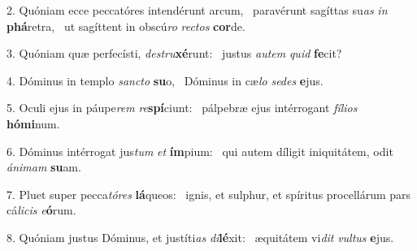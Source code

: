 2. Quóniam ecce peccatóres intendérunt arcum, \dag\  paravérunt sagíttas su\textit{as} \textit{in} \textbf{phá}retra, \ast\  ut sagíttent in obscú\textit{ro} \textit{rec}\textit{tos} \textbf{cor}de.\

3. Quóniam quæ perfecísti, \textit{de}\textit{stru}\textbf{xé}runt: \ast\  justus \textit{au}\textit{tem} \textit{quid} \textbf{fe}cit?\

4. Dóminus in templo \textit{sanc}\textit{to} \textbf{su}o, \ast\  Dóminus in cæ\textit{lo} \textit{se}\textit{des} \textbf{e}jus.\

5. Oculi ejus in páupe\textit{rem} \textit{re}\textbf{spí}ciunt: \ast\  pálpebræ ejus intérrogant \textit{fí}\textit{li}\textit{os} \textbf{hó}\textbf{mi}num.\

6. Dóminus intérrogat jus\textit{tum} \textit{et} \textbf{ím}pium: \ast\  qui autem díligit iniquitátem, odit \textit{á}\textit{ni}\textit{mam} \textbf{su}am.\

7. Pluet super pecca\textit{tó}\textit{res} \textbf{lá}queos: \ast\  ignis, et sulphur, et spíritus procellárum pars cá\textit{li}\textit{cis} \textit{e}\textbf{ó}rum.\

8. Quóniam justus Dóminus, et justíti\textit{as} \textit{di}\textbf{lé}xit: \ast\  æquitátem vi\textit{dit} \textit{vul}\textit{tus} \textbf{e}jus.\

